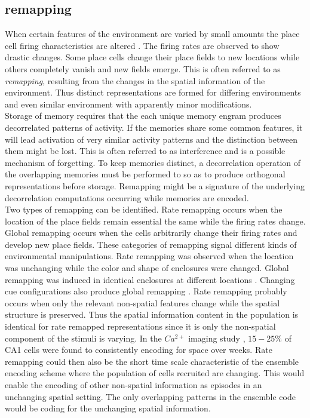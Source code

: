 \subsection{remapping}
\label{remapping}
When certain features of the environment are varied by small amounts the place cell firing characteristics are altered \cite{Kubie1987}. The firing rates are observed to show drastic changes. Some place cells change their place fields to new locations while others completely vanish and new fields emerge. This is often referred to as \emph{remapping}, resulting from the changes in the spatial information of the environment. Thus distinct representations are formed for differing environments and even similar environment with apparently minor modifications. \\
Storage of memory requires that the each unique memory engram produces decorrelated patterns of activity. If the memories share some common features, it will lead activation of very similar activity patterns and the distinction between them might be lost. This is often referred to as interference and is a possible mechanism of forgetting. To keep memories distinct, a decorrelation operation of the overlapping memories must be performed to so as to produce orthogonal representations before storage. Remapping might be a signature of the underlying decorrelation computations occurring while memories are encoded.\\
Two types of remapping can be identified. Rate remapping occurs when the location of the place fields remain essential the same while the firing rates change. Global remapping occurs when the cells arbitrarily change their firing rates and develop new place fields. These categories of remapping signal different kinds of environmental manipulations. Rate remapping was observed when the location was unchanging while the color and shape of enclosures were changed. Global remapping was induced in identical enclosures at different locations \cite{Leutgeb2005a}. Changing cue configurations also produce global remapping \cite{Leutgeb2005a}.
Rate remapping probably occurs when only the relevant non-spatial features change while the spatial structure is preserved. Thus the spatial information content in the population is identical for rate remapped representations since it is only the non-spatial component of the stimuli is varying. In the $Ca^{2+}$ imaging study \cite{Ziv2013}, $15-25 \% $ of CA1 cells were found to consistently encoding for space over weeks. Rate remapping could then also be the short time scale characteristic of the ensemble encoding scheme where the population of cells recruited are changing. This would enable the encoding of other non-spatial information as episodes in an unchanging spatial setting. The only overlapping patterns in the ensemble code would be coding for the unchanging spatial information. \\
